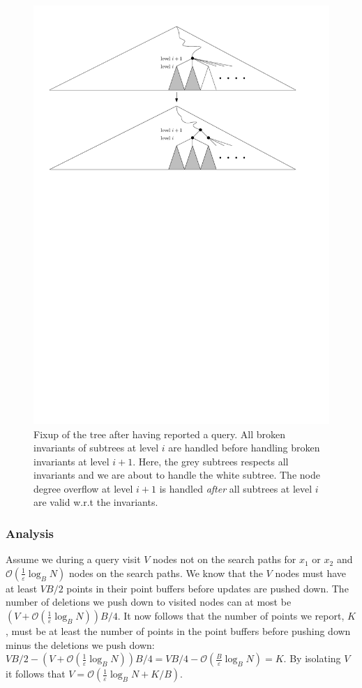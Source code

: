 \documentclass[twoside,11pt,openright]{report}
\def \epsilon {\varepsilon}
\begin{document}
\begin{figure}
\centering
\includegraphics[width=\textwidth]{../figures/gerth_fixup}
\caption{Fixup of the tree after having reported a query. All broken invariants of subtrees at level $i$ are handled before handling broken invariants at level $i + 1$. Here, the grey subtrees respects all invariants and we are about to handle the white subtree. The node degree overflow at level $i + 1$ is handled \textit{after} all subtrees at level $i$ are valid w.r.t the invariants. }
\label{fig:gerth_fixup}
\end{figure}

\subsubsection*{Analysis}

Assume we during a query visit $V$ nodes not on the search paths for $x_1$ or $x_2$ and $\mathcal{O}(\frac{1}{\epsilon}\log_B N)$ nodes on the search paths. We know that the $V$ nodes must have at least $VB/2$ points in their point buffers before updates are pushed down. The number of deletions we push down to visited nodes can at most be $(V + \mathcal{O}(\frac{1}{\epsilon}\log_B N))B/4$. It now follows that the number of points we report, $K$, must be at least the number of points in the point buffers before pushing down minus the deletions we push down: $VB/2 - (V + \mathcal{O}(\frac{1}{\epsilon}\log_B N))B/4 = VB/4 - \mathcal{O}(\frac{B}{\epsilon}\log_B N) = K$. By isolating $V$ it follows that $V = \mathcal{O}(\frac{1}{\epsilon}\log_B N + K/B)$.
\end{document}

